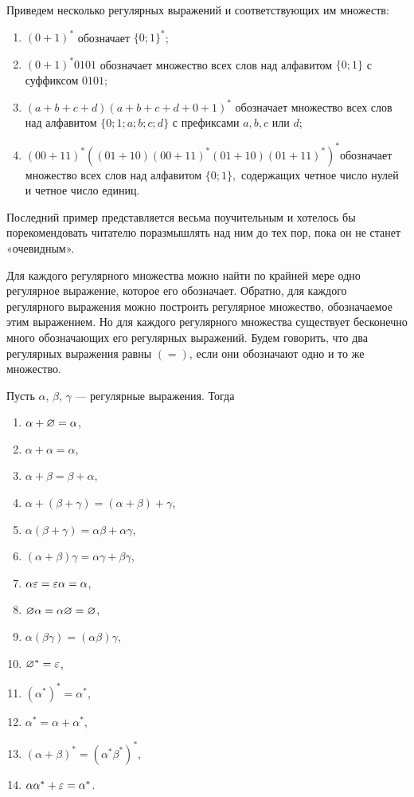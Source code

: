 \begin{myexample}
Приведем несколько регулярных выражений и соответствующих им множеств:
\begin{enumerate}
	\item $(0+1)^*$ обозначает $\{0;1\}^*$;
	\item $(0+1)^*0101$ обозначает множество всех слов над алфавитом $\{0;1\}$ с суффиксом $0101$;
	\item $(a+b+c+d)(a+b+c+d+0+1)^*$ обозначает множество всех слов над алфавитом $\{0;1;a;b;c;d\}$ с префиксами $a, b, c$ или $d$;
	\item $(00+11)^*((01+10)(00+11)^*(01+10)(01+11)^*)^* $обозначает множество всех слов над алфавитом $\{0;1\},$ содержащих четное число нулей и четное число единиц.
\end{enumerate}

Последний пример представляется весьма поучительным и хотелось бы порекомендовать читателю поразмышлять над ним до тех пор, пока он не станет «очевидным».
\end{myexample}

Для каждого регулярного множества можно найти по крайней мере одно регулярное выражение, которое его обозначает. Обратно, для каждого регулярного выражения можно построить регулярное множество, обозначаемое этим выражением. Но для каждого регулярного множества существует бесконечно много обозначающих его регулярных выражений. Будем говорить, что два регулярных выражения равны $(=)$, если они обозначают одно и то же множество.

\begin{mylemma}
\label{LemmaRegExprFeat}
Пусть $\alpha$, $\beta$, $\gamma$ --- регулярные выражения. Тогда
\begin{multicols}{2}
\begin{enumerate}
	\item $\alpha+\varnothing=\alpha$,
	\item $\alpha+\alpha=\alpha$,
	\item $\alpha+\beta=\beta+\alpha$,
	\item $\alpha+(\beta+\gamma)=(\alpha+\beta)+\gamma$,
	\item $\alpha(\beta+\gamma)=\alpha\beta+\alpha\gamma$,
	\item $(\alpha+\beta)\gamma=\alpha\gamma+\beta\gamma$,
	\item $\alpha\varepsilon=\varepsilon\alpha=\alpha$,
	\item $\varnothing\alpha=\alpha\varnothing=\varnothing$,
	\item $\alpha(\beta\gamma)=(\alpha\beta)\gamma$,
	\item $\varnothing^*=\varepsilon$,
	\item $(\alpha^*)^*=\alpha^*$,
	\item $\alpha^*=\alpha+\alpha^*$,
	\item $(\alpha+\beta)^*=(\alpha^*\beta^*)^*$,
	\item $\alpha\alpha^*+\varepsilon=\alpha^*$.
\end{enumerate}
\end{multicols}
\end{mylemma}

